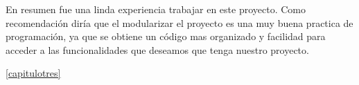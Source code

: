 \documentclass[12pt]{report}
\begin{document}
En resumen fue una linda experiencia trabajar en este proyecto.
\newline
\newline
Como recomendación diría que el modularizar el proyecto es una muy buena practica de programación, ya que se obtiene un código mas organizado y facilidad para acceder a las funcionalidades que deseamos que tenga nuestro proyecto.
\newline\newline
\newline\newline
\newline\newline
\newline\newline
\newline\newline
\newline\newline
\newline\newline
\newline\newline
\newline\newline
\newline\newline
\newline\newline
\newline\newline
\newline\newline
\newline\newline
\newline



 \ref{capitulotres}
\end{document}
